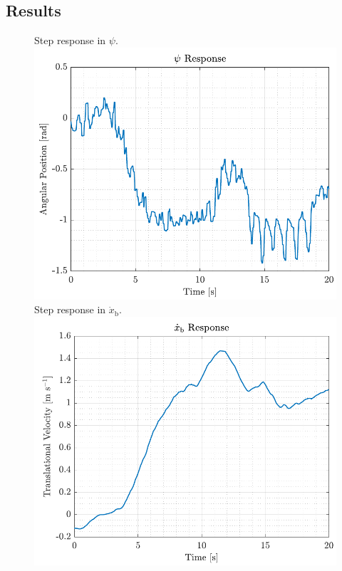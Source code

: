 \subsection*{Results}

\begin{figure}[H]
    \captionbox 
    {   
        Step response in $\psi$.
        \label{fig:inner_yaw_app}
    }                                                                 
    {                                                                  
        \includegraphics[width=.45\textwidth]{figures/inner_yaw}         
    }                                                                    
    \hspace{5pt}                                                          
    \captionbox  
    {      
        Step response in $\dot{x}_\mathrm{b}$.
        \label{fig:inner_xbdot_app}
    }                                                                          
    {
        \includegraphics[width=.45\textwidth]{figures/inner_xbdot}
    }
\end{figure}


